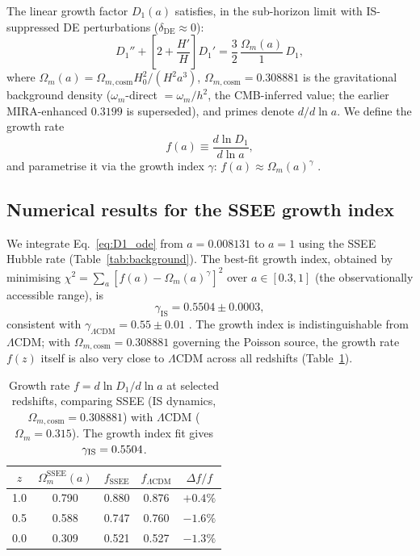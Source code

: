 \documentclass[12pt,a4paper]{article}
\begin{document}
The linear growth factor $D_1(a)$ satisfies, in the sub-horizon limit with
IS-suppressed DE perturbations ($\delta_{\mathrm{DE}} \approx 0$):
\begin{equation}
  D_1'' + \left[2 + \frac{H'}{H}\right]D_1'
  = \frac{3}{2}\,\frac{\Omega_m(a)}{1}\,D_1,
  \label{eq:D1_ode}
\end{equation}
where $\Omega_m(a) = \Omega_{m,\mathrm{cosm}}H_0^2/(H^2 a^3)$,
$\Omega_{m,\mathrm{cosm}} = 0.308881$ is the gravitational background density
($\omega_m$-direct $=\omega_m/h^2$, the CMB-inferred value; the earlier
MIRA-enhanced $0.3199$ is superseded), and primes
denote $d/d\ln a$.
We define the growth rate
\begin{equation}
  f(a) \equiv \frac{d\ln D_1}{d\ln a},
  \label{eq:growth_rate}
\end{equation}
and parametrise it via the growth index $\gamma$:
$f(a) \approx \Omega_m(a)^\gamma$ \citep{Lahav1991,Linder2005}.

\subsection{Numerical results for the SSEE growth index}
\label{subsec:gamma_IS}

We integrate Eq.~\eqref{eq:D1_ode} from $a=0.008131$ to $a=1$ using
the SSEE Hubble rate (Table~\ref{tab:background}).
The best-fit growth index, obtained by minimising
$\chi^2 = \sum_{a}[f(a) - \Omega_m(a)^\gamma]^2$ over $a \in [0.3, 1]$
(the observationally accessible range), is
\begin{equation}
  \gamma_{\mathrm{IS}} = 0.5504 \pm 0.0003,
  \label{eq:gamma_IS}
\end{equation}
consistent with $\gamma_{\Lambda\mathrm{CDM}} = 0.55 \pm 0.01$ \citep{Linder2005}.
The growth index is indistinguishable from $\Lambda$CDM; with $\Omega_{m,\mathrm{cosm}}=0.308881$
governing the Poisson source, the growth rate $f(z)$ itself is also very close to
$\Lambda$CDM across all redshifts (Table~\ref{tab:growth}).

\begin{table}[h!]
\centering
\caption{Growth rate $f = d\ln D_1/d\ln a$ at selected redshifts,
  comparing SSEE (IS dynamics, $\Omega_{m,\mathrm{cosm}}=0.308881$) with
  $\Lambda$CDM ($\Omega_m=0.315$).
  The growth index fit gives $\gamma_{\rm IS} = 0.5504$.}
\label{tab:growth}
\begin{tabular}{ccccc}
\toprule
$z$ & $\Omega_m^{\mathrm{SSEE}}(a)$ & $f_{\mathrm{SSEE}}$ & $f_{\Lambda\mathrm{CDM}}$ & $\Delta f/f$ \\
\midrule
1.0 & 0.790 & 0.880 & 0.876 & $+0.4\%$ \\
0.5 & 0.588 & 0.747 & 0.760 & $-1.6\%$ \\
0.0 & 0.309 & 0.521 & 0.527 & $-1.3\%$ \\
\bottomrule
\end{tabular}
\end{table}
\end{document}
